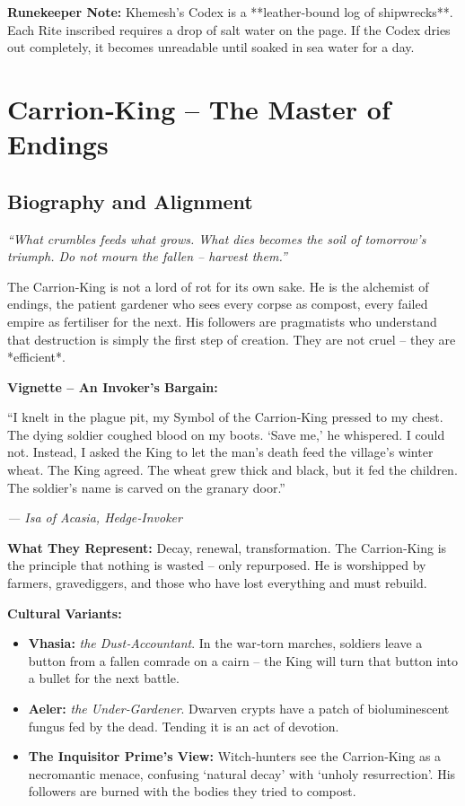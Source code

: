 \documentclass[10pt,a5paper]{book}
\begin{document}
\noindent \textbf{Runekeeper Note:} Khemesh’s Codex is a **leather‑bound log of shipwrecks**. Each Rite inscribed requires a drop of salt water on the page. If the Codex dries out completely, it becomes unreadable until soaked in sea water for a day.

\section{Carrion‑King – The Master of Endings}
\label{patron:carrionking}

\subsection*{Biography and Alignment}

\textit{“What crumbles feeds what grows. What dies becomes the soil of tomorrow’s triumph. Do not mourn the fallen – harvest them.”}

The Carrion‑King is not a lord of rot for its own sake. He is the alchemist of endings, the patient gardener who sees every corpse as compost, every failed empire as fertiliser for the next. His followers are pragmatists who understand that destruction is simply the first step of creation. They are not cruel – they are *efficient*.

\textbf{Vignette – An Invoker’s Bargain:}
\epigraph{“I knelt in the plague pit, my Symbol of the Carrion‑King pressed to my chest. The dying soldier coughed blood on my boots. ‘Save me,’ he whispered. I could not. Instead, I asked the King to let the man’s death feed the village’s winter wheat. The King agreed. The wheat grew thick and black, but it fed the children. The soldier’s name is carved on the granary door.”}{\textit{— Isa of Acasia, Hedge‑Invoker}}

\textbf{What They Represent:} Decay, renewal, transformation. The Carrion‑King is the principle that nothing is wasted – only repurposed. He is worshipped by farmers, gravediggers, and those who have lost everything and must rebuild.

\textbf{Cultural Variants:}
\begin{itemize}
    \item \textbf{Vhasia:} \textit{the Dust‑Accountant}. In the war‑torn marches, soldiers leave a button from a fallen comrade on a cairn – the King will turn that button into a bullet for the next battle.
    \item \textbf{Aeler:} \textit{the Under‑Gardener}. Dwarven crypts have a patch of bioluminescent fungus fed by the dead. Tending it is an act of devotion.
    \item \textbf{The Inquisitor Prime’s View:} Witch‑hunters see the Carrion‑King as a necromantic menace, confusing ‘natural decay’ with ‘unholy resurrection’. His followers are burned with the bodies they tried to compost.
\end{itemize}
\end{document}
